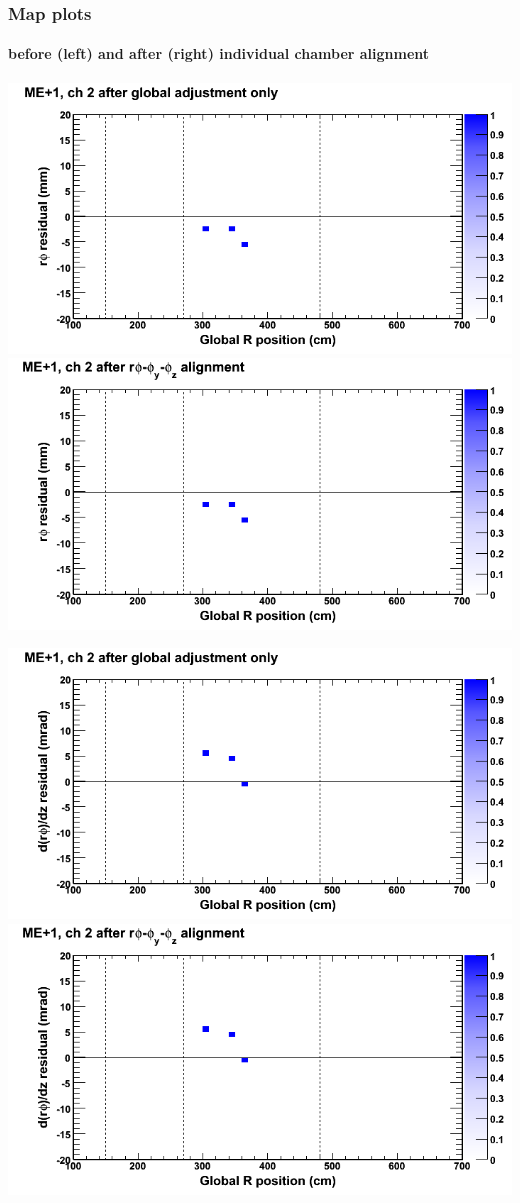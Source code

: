 \documentclass[compress]{beamer}
\begin{document}
\begin{frame}
\frametitle{Map plots}
\framesubtitle{before (left) and after (right) individual chamber alignment}
\includegraphics[width=0.5\linewidth]{ringmapplots_3dof/before_CSCvsr_mep1ch02_x.png} \includegraphics[width=0.5\linewidth]{ringmapplots_3dof/after_CSCvsr_mep1ch02_x.png}

\includegraphics[width=0.5\linewidth]{ringmapplots_3dof/before_CSCvsr_mep1ch02_dxdz.png} \includegraphics[width=0.5\linewidth]{ringmapplots_3dof/after_CSCvsr_mep1ch02_dxdz.png}
\end{frame}
\end{document}
